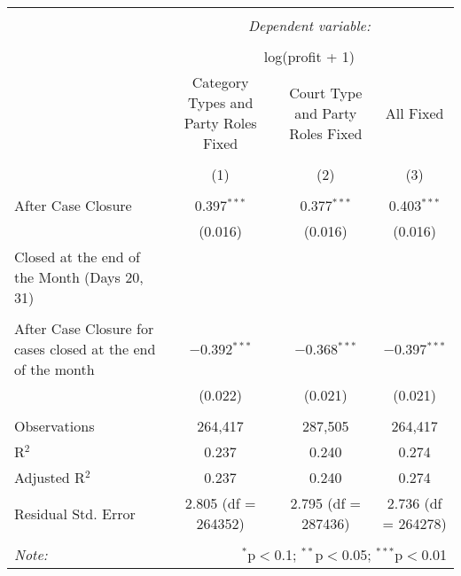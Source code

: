 \documentclass[12pt]{article}
\begin{document}
\begin{landscape}
\begin{table}[!htbp]
\begin{tabular}{@{\extracolsep{2pt}}lccc}
\\[-1.8ex]\hline 
\hline \\[-1.8ex] 
 & \multicolumn{3}{c}{\textit{Dependent variable:}} \\ 
\cline{2-4} 
\\[-1.8ex] & \multicolumn{3}{c}{log(profit + 1)} \\ 
 & Category Types and Party Roles Fixed & Court Type and Party Roles Fixed & All Fixed \\ 
\\[-1.8ex] & (1) & (2) & (3)\\ 
\hline \\[-1.8ex] 
 After Case Closure & 0.397$^{***}$ & 0.377$^{***}$ & 0.403$^{***}$ \\ 
  & (0.016) & (0.016) & (0.016) \\ 
  Closed at the end of the Month (Days 20, 31) &  &  &  \\ 
  &  &  &  \\ 
  After Case Closure for cases closed at the end of the month & $-$0.392$^{***}$ & $-$0.368$^{***}$ & $-$0.397$^{***}$ \\ 
  & (0.022) & (0.021) & (0.021) \\ 
 \hline \\[-1.8ex] 
Observations & 264,417 & 287,505 & 264,417 \\ 
R$^{2}$ & 0.237 & 0.240 & 0.274 \\ 
Adjusted R$^{2}$ & 0.237 & 0.240 & 0.274 \\ 
Residual Std. Error & 2.805 (df = 264352) & 2.795 (df = 287436) & 2.736 (df = 264278) \\ 
\hline 
\hline \\[-1.8ex] 
\textit{Note:}  & \multicolumn{3}{r}{$^{*}$p$<$0.1; $^{**}$p$<$0.05; $^{***}$p$<$0.01} \\ 
\end{tabular} 
\end{table} 



\end{landscape}
\end{document}
